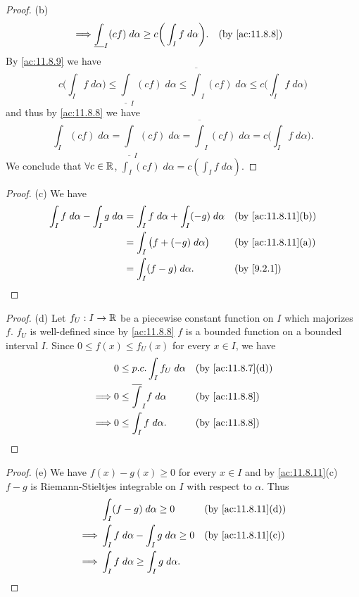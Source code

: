 \begin{proof}{(b)}
\begin{align*}
    \implies & \underline{\int}_I (cf) \; d \alpha \geq c\bigg(\int_I f \; d \alpha\bigg).                                                         &  & \text{(by \cref{ac:11.8.8})}
  \end{align*}
  By \cref{ac:11.8.9} we have
  \[
    c\bigg(\int_I f \; d \alpha\bigg) \leq \underline{\int}_I (cf) \; d \alpha \leq \overline{\int}_I (cf) \; d \alpha \leq c\bigg(\int_I f \; d \alpha\bigg)
  \]
  and thus by \cref{ac:11.8.8} we have
  \[
    \int_I (cf) \; d \alpha = \underline{\int}_I (cf) \; d \alpha = \overline{\int}_I (cf) \; d \alpha = c\bigg(\int_I f \; d \alpha\bigg).
  \]
  We conclude that \(\forall c \in \mathbb{R}\), \(\int_I (cf) \; d \alpha = c (\int_I f \; d \alpha)\).
\end{proof}

\begin{proof}{(c)}
  We have
  \begin{align*}
    \int_I f \; d \alpha - \int_I g \; d \alpha & = \int_I f \; d \alpha + \int_I (-g) \; d \alpha &  & \text{(by \cref{ac:11.8.11}(b))} \\
                                                & = \int_I \big(f + (-g) \; d \alpha\big)          &  & \text{(by \cref{ac:11.8.11}(a))} \\
                                                & = \int_I (f - g) \; d \alpha.                    &  & \text{(by \cref{9.2.1})}
  \end{align*}
\end{proof}

\begin{proof}{(d)}
  Let \(f_U : I \to \mathbb{R}\) be a piecewise constant function on \(I\) which majorizes \(f\).
  \(f_U\) is well-defined since by \cref{ac:11.8.8} \(f\) is a bounded function on a bounded interval \(I\).
  Since \(0 \leq f(x) \leq f_U(x)\) for every \(x \in I\), we have
  \begin{align*}
             & 0 \leq p.c. \int_I f_U \; d \alpha     &  & \text{(by \cref{ac:11.8.7}(d))} \\
    \implies & 0 \leq \overline{\int}_I f \; d \alpha &  & \text{(by \cref{ac:11.8.8})}    \\
    \implies & 0 \leq \int_I f \; d \alpha.           &  & \text{(by \cref{ac:11.8.8})}
  \end{align*}
\end{proof}

\begin{proof}{(e)}
  We have \(f(x) - g(x) \geq 0\) for every \(x \in I\) and by \cref{ac:11.8.11}(c) \(f - g\) is Riemann-Stieltjes integrable on \(I\) with respect to \(\alpha\).
  Thus
  \begin{align*}
             & \int_I (f - g) \; d \alpha \geq 0                  &  & \text{(by \cref{ac:11.8.11}(d))} \\
    \implies & \int_I f \; d \alpha - \int_I g \; d \alpha \geq 0 &  & \text{(by \cref{ac:11.8.11}(c))} \\
    \implies & \int_I f \; d \alpha \geq \int_I g \; d \alpha.
  \end{align*}
\end{proof}

